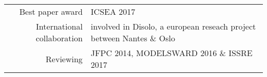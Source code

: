 
\begin{tabular}{r @{~$\rangle$~} p{}}

Best paper award & ICSEA 2017\\

International collaboration & involved in Disolo, a european reseach project between Nantes \& Oslo \\

Reviewing & JFPC 2014, MODELSWARD 2016 \& ISSRE 2017 \\

\end{tabular}
